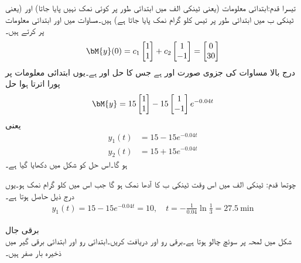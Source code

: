 تیسرا قدم:\quad  ابتدائی معلومات  (یعنی  ٹینکی الف میں ابتدائی طور پر کوئی نمک نہیں پایا جاتا)  اور  (یعنی ٹینکی ب میں ابتدائی طور پر تیس کلو گرام نمک پایا جاتا ہے) ہیں۔مساوات  میں  اور ابتدائی معلومات پر کرتے ہیں۔
\begin{align*}
\bM{y}(0)=c_1\begin{bmatrix} 1 \\ 1 \end{bmatrix}+c_2 \begin{bmatrix} 1 \\ -1 \end{bmatrix}=\begin{bmatrix} 0 \\ 30 \end{bmatrix}
\end{align*}
درج بالا مساوات کی جزوی صورت  اور  ہے جس کا حل  اور  ہے۔یوں ابتدائی معلومات پر پورا اترتا ہوا حل
\begin{align*}
\bM{y}=15\begin{bmatrix} 1 \\ 1 \end{bmatrix}-15 \begin{bmatrix} 1 \\ -1 \end{bmatrix} e^{-0.04 t}
\end{align*}
یعنی
\begin{align*}
y_1(t)&=15-15e^{-0.04 t}\\
y_2(t)&=15+15e^{-0.04 t}
\end{align*}
ہو گا۔اس حل کو شکل  میں دکھایا گیا ہے۔

چوتھا قدم: ٹینکی الف میں اس وقت ٹینکی ب کا آدھا نمک ہو گا جب اس میں  کلو گرام نمک ہو۔یوں درج ذیل حاصل ہوتا ہے۔
\begin{align*}
y_1(t)=15-15e^{-0.04 t}=10,\quad t=-\frac{1}{0.04}\ln \frac{1}{3}=\SI{27.5}{\minute}
\end{align*}

\quad برقی جال\\
شکل  میں لمحہ  پر سوئچ چالو ہوتا ہے۔برقی رو  اور  دریافت کریں۔ابتدائی رو اور ابتدائی برقی گیر میں ذخیرہ بار صفر ہیں۔


